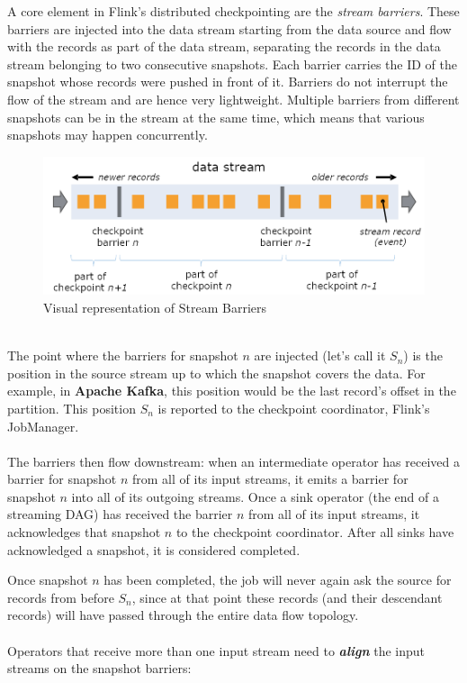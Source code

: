 A core element in Flink’s distributed checkpointing are the \textit{stream barriers}. These barriers are injected into the data stream starting from the data source and flow with the records as part of the data stream, separating the records in the data stream belonging to two consecutive snapshots. Each barrier carries the ID of the snapshot whose records were pushed in front of it. Barriers do not interrupt the flow of the stream and are hence very lightweight. Multiple barriers from different snapshots can be in the stream at the same time, which means that various snapshots may happen concurrently.
\\
\begin{figure}[h]
    \centering
    \includegraphics[width=1\linewidth]{Figures/stream_barriers}
    \caption{Visual representation of Stream Barriers}
    \label{fig:streambarriers}
\end{figure}
\\
The point where the barriers for snapshot $n$ are injected (let’s call it $S_n$) is the position in the source stream up to which the snapshot covers the data. For example, in \textbf{Apache Kafka}, this position would be the last record’s offset in the partition. This position $S_n$ is reported to the checkpoint coordinator, Flink’s JobManager.
\\
\\
The barriers then flow downstream: when an intermediate operator has received a barrier for snapshot $n$ from all of its input streams, it emits a barrier for snapshot $n$ into all of its outgoing streams. Once a sink operator (the end of a streaming DAG) has received the barrier $n$ from all of its input streams, it acknowledges that snapshot $n$ to the checkpoint coordinator. After all sinks have acknowledged a snapshot, it is considered completed.

Once snapshot $n$ has been completed, the job will never again ask the source for records from before $S_n$, since at that point these records (and their descendant records) will have passed through the entire data flow topology.
\\
\\
Operators that receive more than one input stream need to \textit{\textbf{align}} the input streams on the snapshot barriers:

